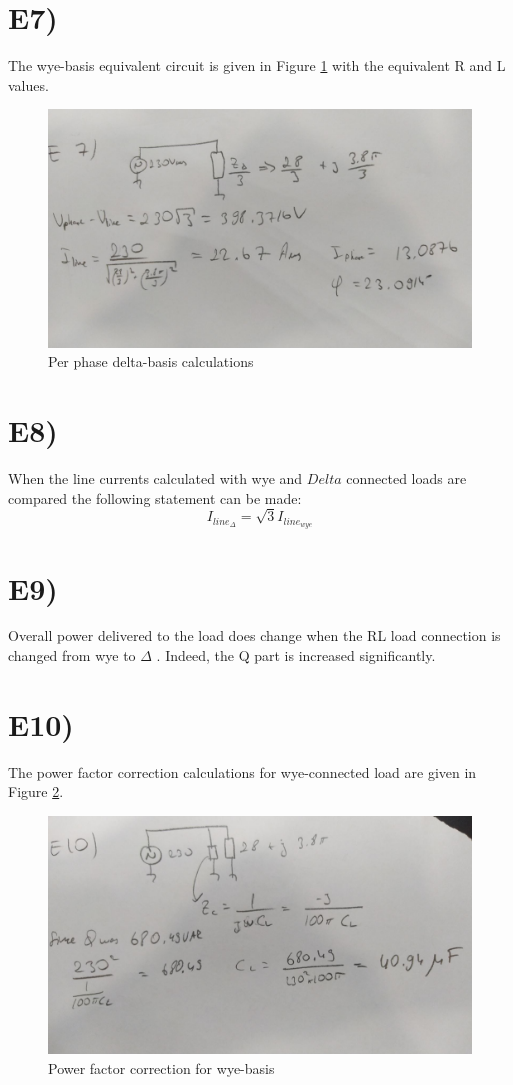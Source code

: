 \documentclass[letterpaper,12pt]{article}
\begin{document}
\section{E7)}
The wye-basis equivalent circuit is given in Figure \ref*{E7} with the equivalent R and L values.

\begin{figure}[H]
    \centering
    \includegraphics[width = 1\textwidth]{E7.jpeg}
    \caption{Per phase delta-basis calculations }
    \label{E7}
\end{figure}

\section{E8)}
When the line currents calculated with  wye and \(Delta\) connected loads are compared the following statement can be made:
\[
I_{line_\Delta} = \sqrt{3} I_{line_{wye}}    
\]

\section{E9)}
Overall power delivered to the load does change when the RL load connection is changed from wye to \(\Delta\) . Indeed, the Q part is increased significantly.

\section{E10)}
The power factor correction calculations for wye-connected load are given in Figure \ref*{E10}.

\begin{figure}[H]
    \centering
    \includegraphics[width = 1\textwidth]{E10.jpeg}
    \caption{Power factor correction for wye-basis}
    \label{E10}
\end{figure}
\end{document}

